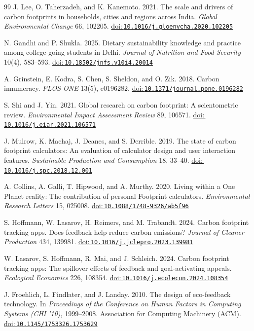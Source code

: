 \documentclass[12pt, a4paper]{article}
\newcommand{\doi}[1]{\href{https://doi.org/#1}{doi:\,\nolinkurl{#1}}}
\begin{document}

\clearpage
\begin{thebibliography}{99}
J. Lee, O. Taherzadeh, and K. Kanemoto. 2021. The scale and drivers of carbon footprints in households, cities and regions across India. \emph{Global Environmental Change} 66, 102205. \doi{10.1016/j.gloenvcha.2020.102205}

N. Gandhi and P. Shukla. 2025. Dietary sustainability knowledge and practice among college-going students in Delhi. \emph{Journal of Nutrition and Food Security} 10(4), 583--593. \doi{10.18502/jnfs.v10i4.20014}

A. Grinstein, E. Kodra, S. Chen, S. Sheldon, and O. Zik. 2018. Carbon innumeracy. \emph{PLOS ONE} 13(5), e0196282. \doi{10.1371/journal.pone.0196282}

S. Shi and J. Yin. 2021. Global research on carbon footprint: A scientometric review. \emph{Environmental Impact Assessment Review} 89, 106571. \doi{10.1016/j.eiar.2021.106571}

J. Mulrow, K. Machaj, J. Deanes, and S. Derrible. 2019. The state of carbon footprint calculators: An evaluation of calculator design and user interaction features. \emph{Sustainable Production and Consumption} 18, 33--40. \doi{10.1016/j.spc.2018.12.001}

A. Collins, A. Galli, T. Hipwood, and A. Murthy. 2020. Living within a One Planet reality: The contribution of personal Footprint calculators. \emph{Environmental Research Letters} 15, 025008. \doi{10.1088/1748-9326/ab5f96}

S. Hoffmann, W. Lasarov, H. Reimers, and M. Trabandt. 2024. Carbon footprint tracking apps. Does feedback help reduce carbon emissions? \emph{Journal of Cleaner Production} 434, 139981. \doi{10.1016/j.jclepro.2023.139981}

W. Lasarov, S. Hoffmann, R. Mai, and J. Schleich. 2024. Carbon footprint tracking apps: The spillover effects of feedback and goal-activating appeals. \emph{Ecological Economics} 226, 108354. \doi{10.1016/j.ecolecon.2024.108354}

J. Froehlich, L. Findlater, and J. Landay. 2010. The design of eco-feedback technology. In \emph{Proceedings of the Conference on Human Factors in Computing Systems (CHI '10)}, 1999--2008. Association for Computing Machinery (ACM). \doi{10.1145/1753326.1753629}


\end{thebibliography}
\end{document}
